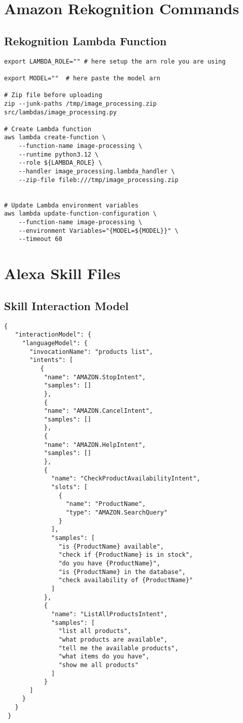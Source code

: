 \documentclass[12pt]{article}
\begin{document}
\newpage

\section{Amazon Rekognition Commands}

\subsection{Rekognition Lambda Function}\label{appendix:recognition_lambda}
\begin{lstlisting}
export LAMBDA_ROLE="" # here setup the arn role you are using

export MODEL=""  # here paste the model arn

# Zip file before uploading
zip --junk-paths /tmp/image_processing.zip src/lambdas/image_processing.py

# Create Lambda function
aws lambda create-function \
    --function-name image-processing \
    --runtime python3.12 \
    --role ${LAMBDA_ROLE} \
    --handler image_processing.lambda_handler \
    --zip-file fileb:///tmp/image_processing.zip


# Update Lambda environment variables
aws lambda update-function-configuration \
    --function-name image-processing \
    --environment Variables="{MODEL=${MODEL}}" \
    --timeout 60
\end{lstlisting}


\section{Alexa Skill Files}

\subsection{Skill Interaction Model} \label{appendix:interaction}
\begin{lstlisting}
{
   "interactionModel": {
     "languageModel": {
       "invocationName": "products list",
       "intents": [
          {
           "name": "AMAZON.StopIntent",
           "samples": []
           },
           {
           "name": "AMAZON.CancelIntent",
           "samples": []
           },
           {
           "name": "AMAZON.HelpIntent",
           "samples": []
           },
           {
             "name": "CheckProductAvailabilityIntent",
             "slots": [
               {
                 "name": "ProductName",
                 "type": "AMAZON.SearchQuery"
               }
             ],
             "samples": [
               "is {ProductName} available",
               "check if {ProductName} is in stock",
               "do you have {ProductName}",
               "is {ProductName} in the database",
               "check availability of {ProductName}"
             ]
           },
           {
             "name": "ListAllProductsIntent",
             "samples": [
               "list all products",
               "what products are available",
               "tell me the available products",
               "what items do you have",
               "show me all products"
             ]
           }
       ]
     }
   }
 }
\end{lstlisting}
\end{document}
